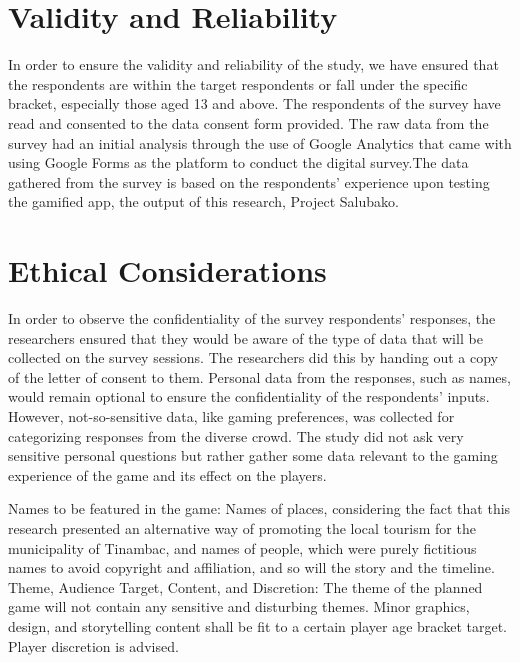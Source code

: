 \documentclass[11pt]{research}
\begin{document}
\section{Validity and Reliability}
In order to ensure the validity and reliability of the study, we have ensured that the respondents are within the target respondents or fall under the specific bracket, especially those aged 13 and above. The respondents of the survey have read and consented to the data consent form provided. The raw data from the survey had an initial analysis through the use of Google Analytics that came with using Google Forms as the platform to conduct the digital survey.The data gathered from the survey is based on the respondents’ experience upon testing the gamified app, the output of this research, Project Salubako. 

\section{Ethical Considerations}
In order to observe the confidentiality of the survey respondents’ responses, the researchers ensured that they would be aware of the type of data that will be collected on the survey sessions. The researchers did this by handing out a copy of the letter of consent to them. Personal data from the responses, such as names, would remain optional to ensure the confidentiality of the respondents’ inputs. However, not-so-sensitive data, like gaming preferences, was  collected for categorizing responses from the diverse crowd. The study did not ask very sensitive personal questions but rather gather some data relevant to the gaming experience of the game and its effect on the players.

Names to be featured in the game: Names of places, considering the fact that  this research presented an alternative way of promoting the local tourism for the municipality of Tinambac, and names of people, which were purely fictitious names to avoid copyright and affiliation, and so will the story and the timeline. Theme, Audience Target, Content, and Discretion: The theme of the planned game will not contain any sensitive and disturbing themes. Minor graphics, design, and storytelling content shall be fit to a certain player age bracket target. Player discretion is advised.

\end{document}
